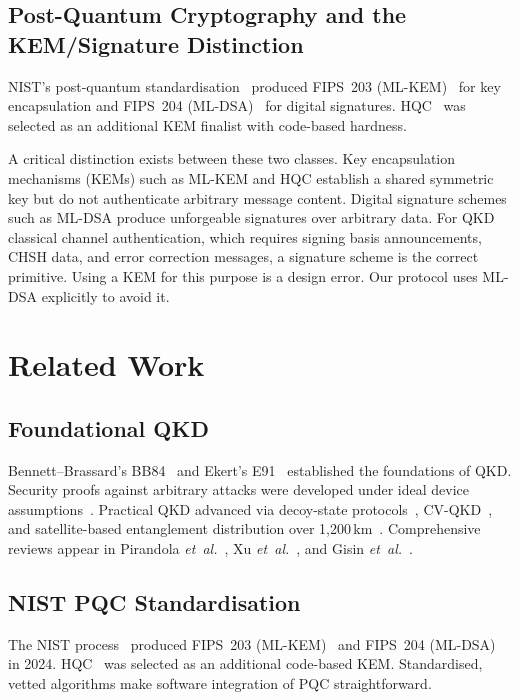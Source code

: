 \documentclass[conference]{IEEEtran}
\begin{document}
\subsection{Post-Quantum Cryptography and the KEM/Signature Distinction}
NIST's post-quantum standardisation~\cite{nist2022} produced FIPS~203 (ML-KEM)~\cite{fips203} for key encapsulation and FIPS~204 (ML-DSA)~\cite{fips204} for digital signatures. HQC~\cite{hqc2022} was selected as an additional KEM finalist with code-based hardness.

A critical distinction exists between these two classes. Key encapsulation mechanisms (KEMs) such as ML-KEM and HQC establish a shared symmetric key but do not authenticate arbitrary message content. Digital signature schemes such as ML-DSA produce unforgeable signatures over arbitrary data. For QKD classical channel authentication, which requires signing basis announcements, CHSH data, and error correction messages, a signature scheme is the correct primitive. Using a KEM for this purpose is a design error. Our protocol uses ML-DSA explicitly to avoid it.

\section{Related Work}
\label{sec:related}

\subsection{Foundational QKD}
Bennett--Brassard's BB84~\cite{bennett1984} and Ekert's E91~\cite{ekert1991} established the foundations of QKD. Security proofs against arbitrary attacks were developed under ideal device assumptions~\cite{scarani2009}. Practical QKD advanced via decoy-state protocols~\cite{lo2005}, CV-QKD~\cite{pirandola2020}, and satellite-based entanglement distribution over 1{,}200\,km~\cite{liao2017}. Comprehensive reviews appear in Pirandola \emph{et~al.}~\cite{pirandola2020}, Xu \emph{et~al.}~\cite{xu2020}, and Gisin \emph{et~al.}~\cite{gisin2002}.

\subsection{NIST PQC Standardisation}
The NIST process~\cite{nist2022} produced FIPS~203 (ML-KEM)~\cite{fips203} and FIPS~204 (ML-DSA)~\cite{fips204} in 2024. HQC~\cite{hqc2022} was selected as an additional code-based KEM. Standardised, vetted algorithms make software integration of PQC straightforward.
\end{document}
